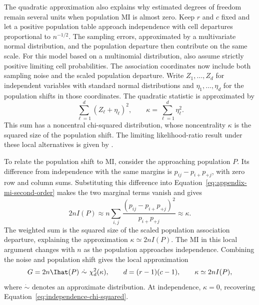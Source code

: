 The quadratic approximation also explains why estimated degrees of freedom
remain several units when population MI is almost zero. Keep \(r\) and
\(c\) fixed and let a positive population table approach independence with
cell departures proportional to \(n^{-1/2}\). The sampling errors, approximated
by a multivariate normal distribution, and the population departure then
contribute on the same scale. For this model based on a multinomial
distribution, also assume strictly positive limiting cell probabilities.
The association coordinates now include both sampling noise and the
scaled population departure. Write \(Z_1,\ldots,Z_d\) for independent
variables with standard normal distributions and
\(\eta_1,\ldots,\eta_d\) for the population shifts in those coordinates.
The quadratic statistic is approximated by
\begin{equation}
 \sum_{\ell=1}^d(Z_\ell+\eta_\ell)^2,
 \qquad \kappa=\sum_{\ell=1}^d\eta_\ell^2.
 \label{eq:local-association-squares}
\end{equation}
This sum has a noncentral chi-squared distribution, whose noncentrality
\(\kappa\) is the squared size of the population shift. The limiting
likelihood-ratio result under these local alternatives is given by
\citet{banerjee2005}.

To relate the population shift to MI, consider the approaching population
\(P\). Its difference from independence with the same margins is
\(p_{ij}-p_{i+}p_{+j}\), with zero row and column sums. Substituting
this difference into Equation~\eqref{eq:appendix-mi-second-order} makes
the two marginal terms vanish and gives
\begin{equation}
 2nI(P)\approx n\sum_{i,j}
       \frac{(p_{ij}-p_{i+}p_{+j})^2}{p_{i+}p_{+j}}
       \approx\kappa.
 \label{eq:local-mi-noncentrality}
\end{equation}
The weighted sum is the squared size of the scaled population association
departure, explaining the approximation \(\kappa\simeq2nI(P)\).
The MI in this local argument changes with \(n\) as the population
approaches independence. Combining the noise and population shift gives
the local approximation
\begin{equation}
 G=2n\Ihat(P)\ \dot\sim\ \chi^2_d(\kappa),
 \qquad d=(r-1)(c-1),\qquad \kappa\simeq2nI(P),
 \label{eq:local-noncentral-mi}
\end{equation}
where \(\dot\sim\) denotes an approximate distribution. At independence,
\(\kappa=0\), recovering Equation~\eqref{eq:independence-chi-squared}.

